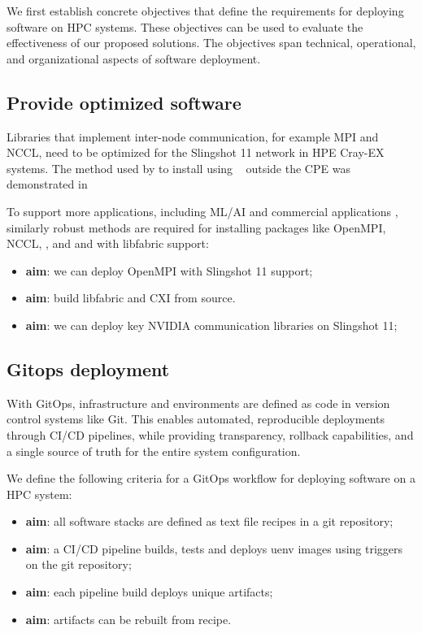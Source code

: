 We first establish concrete objectives that define the requirements for deploying software on HPC systems.
These objectives can be used to evaluate the effectiveness of our proposed solutions.
The objectives span technical, operational, and organizational aspects of software deployment.

\subsection{Provide optimized software}

Libraries that implement inter-node communication, for example MPI and NCCL, need to be optimized for the Slingshot 11 network in HPE Cray-EX systems.
The method used by \stackinator to install \craympich using \spack~\cite{gamblin:sc15} outside the CPE was demonstrated in~\cite{uenv2023} 

To support more applications, including ML/AI and commercial applications , similarly robust methods are required for installing packages like OpenMPI, NCCL, \nvshmem, \cufftmp and \cusolvermp and with libfabric support:
\begin{itemize}
    \item \textbf{aim}: we can deploy OpenMPI with Slingshot 11 support;
    \item \textbf{aim}: build libfabric and CXI from source.
    \item \textbf{aim}: we can deploy key NVIDIA communication libraries on Slingshot 11;
\end{itemize}

\subsection{Gitops deployment}

With GitOps, infrastructure and environments are defined as code in version control systems like Git.
This enables automated, reproducible deployments through CI/CD pipelines, while providing transparency, rollback capabilities, and a single source of truth for the entire system configuration.

We define the following criteria for a GitOps workflow for deploying software on a HPC system:
\begin{itemize}
    \item \textbf{aim}: all software stacks are defined as text file recipes in a git repository;
    \item \textbf{aim}: a CI/CD pipeline builds, tests and deploys uenv images using triggers on the git repository;
    \item \textbf{aim}: each pipeline build deploys unique artifacts;
    \item \textbf{aim}: artifacts can be rebuilt from recipe.
\end{itemize}

